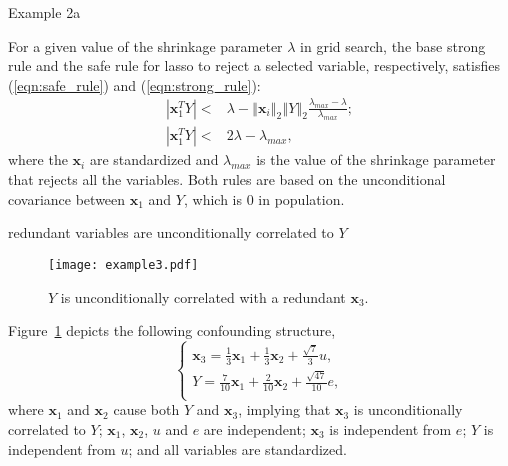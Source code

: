 \documentclass{beamer}
\begin{document}
\begin{frame}{Example 2a}

  For a given value of the shrinkage parameter $\lambda$ in grid search, the base strong rule and the safe rule for lasso to reject a selected variable, respectively, satisfies (\ref{eqn:safe_rule}) and (\ref{eqn:strong_rule}):
  \begin{eqnarray}
    \left\vert \mathbf{x}_1^T Y \right\vert < & \lambda - \left\Vert \mathbf{x}_i \right\Vert_2 \left\Vert Y \right\Vert_2 \frac{\lambda_{max} - \lambda} {\lambda_{max}} ; \label{eqn:safe_rule} \\
    \left\vert \mathbf{x}_1^T Y \right\vert < & 2\lambda - \lambda_{max} , \label{eqn:strong_rule}
    \label{eqn:post_estmation_rule}
  \end{eqnarray}
  where the $\mathbf{x}_i$ are standardized and $\lambda_{max}$ is the value of the shrinkage parameter that rejects all the variables. Both rules are based on the unconditional covariance between $\mathbf{x}_1$ and $Y$, which is $0$ in population.

\end{frame}

\begin{frame}{redundant variables are unconditionally correlated to $Y$}
  \begin{figure}[ht]
    \centering
    \texttt{[image: example3.pdf]}
    \caption{$Y$ is unconditionally correlated with a redundant $\mathbf{x}_3$.}
    \label{fig:cond_example}
  \end{figure}
  
  Figure~\ref{fig:cond_example} depicts the following confounding structure,
  \begin{equation}
    \begin{cases}
      \mathbf{x}_3 = \frac{1}{3} \mathbf{x}_1 + \frac{1}{3} \mathbf{x}_2 + \frac{\sqrt{7}}{3} u, \\
      Y = \frac{7}{10} \mathbf{x}_1 +  \frac{2}{10} \mathbf{x}_2 +  \frac{\sqrt{47}}{10} e, \\
    \end{cases}
    \label{eqn:example_4}
  \end{equation}
  where $\mathbf{x}_1$ and $\mathbf{x}_2$ cause both $Y$ and $\mathbf{x}_3$, implying that $\mathbf{x}_3$ is unconditionally correlated to $Y$; $\mathbf{x}_1$, $\mathbf{x}_2$, $u$ and $e$ are independent; $\mathbf{x}_3$ is independent from $e$; $Y$ is independent from $u$; and all variables are standardized.
\end{frame}
\end{document}
